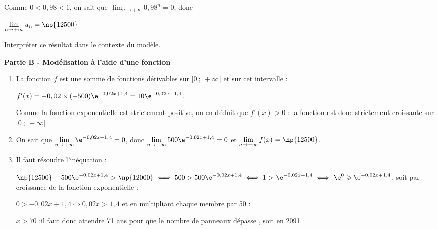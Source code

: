 \begin{enumerate}
\begin{enumerate}
Comme $0 < 0,98 < 1$, on sait que $\displaystyle\lim_{n \to + \infty} 0,98^n = 0$, donc 
		
$\displaystyle\lim_{n \to + \infty} u_n = \np{12500}$
		
Interpréter ce résultat dans le contexte du modèle.
	\end{enumerate}
\end{enumerate}

\bigskip

\textbf{Partie B - Modélisation à l'aide d'une fonction}

%
%

\medskip

\begin{enumerate}
\item %
La fonction $f$ est une somme de fonctions dérivables sur $[0~;~ +\infty[$ et sur cet intervalle :

$f'(x) = - 0,02 \times (- 500)\e^{-0,02x+1,4} = 10\e^{-0,02x+1,4}$.

Comme la fonction exponentielle est strictement positive, on en déduit que $f'(x) > 0$ : la fonction est donc strictement croissante sur $[0~;~ +\infty[$ 
\item %
On sait que $\displaystyle\lim_{n \to + \infty} \e^{-0,02x+1,4} = 0$, donc $\displaystyle\lim_{n \to + \infty} 500 \e^{-0,02x+1,4} = 0$ et $\displaystyle\lim_{n \to + \infty} f(x) = \np{12500}$.
\item %
Il faut résoudre l'inéquation :

$\np{12500} - 500 \e^{-0,02x+1,4} > \np{12000} \iff 500 > 500\e^{-0,02x+1,4} \iff 1 >\e^{-0,02x+1,4} \iff \e^0 \geqslant \e^{-0,02x+1,4}$, soit par croissance de la fonction exponentielle :

$0 > - 0,02x + 1,4 \iff 0,02x > 1,4$ et en multipliant chaque membre par 50 : 

$x > 70$ :il faut donc attendre 71 ans pour que le nombre de panneaux dépasse , soit en 2091.

\end{enumerate}

\bigskip

